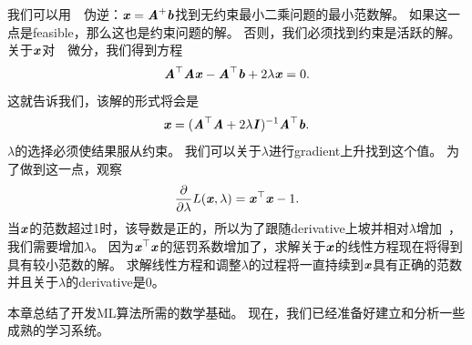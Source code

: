 我们可以用~~伪逆：$\Vx = \MA^+ \Vb$找到无约束最小二乘问题的最小范数解。
如果这一点是\gls{feasible}，那么这也是约束问题的解。
否则，我们必须找到约束是活跃的解。
关于$\Vx$对~~微分，我们得到方程
\begin{align}
 \MA^\Tsp \MA \Vx - \MA^\Tsp \Vb + 2 \lambda \Vx = 0.
\end{align}
这就告诉我们，该解的形式将会是
\begin{align}
\Vx =  (\MA^\Tsp \MA + 2 \lambda \MI )^{-1} \MA^\Tsp \Vb.
\end{align}
$\lambda$的选择必须使结果服从约束。
我们可以关于$\lambda$进行\gls{gradient}上升找到这个值。
为了做到这一点，观察
\begin{align}
 \frac{\partial}{\partial \lambda} L(\Vx, \lambda)  = \Vx^\Tsp \Vx - 1.
\end{align}
当$\Vx$的范数超过1时，该导数是正的，所以为了跟随\gls{derivative}上坡并相对$\lambda$增加~，我们需要增加$\lambda$。
因为$\Vx^\Tsp \Vx$的惩罚系数增加了，求解关于$\Vx$的线性方程现在将得到具有较小范数的解。
求解线性方程和调整$\lambda$的过程将一直持续到$\Vx$具有正确的范数并且关于$\lambda$的\gls{derivative}是$0$。

本章总结了开发\gls{ML}算法所需的数学基础。
现在，我们已经准备好建立和分析一些成熟的学习系统。


